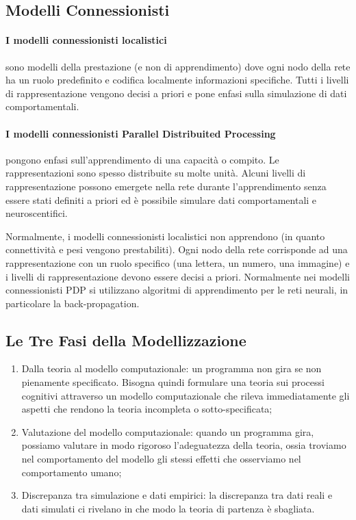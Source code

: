 \documentclass[12pt, a4paper]{article}
\begin{document}
\subsection{Modelli Connessionisti}
\paragraph{I modelli connessionisti localistici} sono modelli della prestazione (e non di apprendimento) dove ogni nodo della rete ha un ruolo predefinito e codifica localmente informazioni specifiche. Tutti i livelli di rappresentazione vengono decisi a priori e pone enfasi sulla simulazione di dati comportamentali.
\paragraph{I modelli connessionisti Parallel Distribuited Processing} pongono enfasi sull'apprendimento di una capacità o compito. Le rappresentazioni sono spesso distribuite su molte unità. Alcuni livelli di rappresentazione possono emergete nella rete durante l'apprendimento senza essere stati definiti a priori ed è possibile simulare dati comportamentali e neuroscentifici.

Normalmente, i modelli connessionisti localistici non apprendono (in quanto connettività e pesi vengono prestabiliti). Ogni nodo della rete corrisponde ad una rappresentazione con un ruolo specifico (una lettera, un numero, una immagine) e i livelli di rappresentazione devono essere decisi a priori.
Normalmente nei modelli connessionisti PDP si utilizzano algoritmi di apprendimento per le reti neurali, in particolare la back-propagation.

\subsection{Le Tre Fasi della Modellizzazione}
\begin{enumerate}
    \item Dalla teoria al modello computazionale: un programma non gira se non pienamente specificato. Bisogna quindi formulare una teoria sui processi cognitivi attraverso un modello computazionale che rileva immediatamente gli aspetti che rendono la teoria incompleta o sotto-specificata;
    \item Valutazione del modello computazionale: quando un programma gira, possiamo valutare in modo rigoroso l'adeguatezza della teoria, ossia troviamo nel comportamento del modello gli stessi effetti che osserviamo nel comportamento umano;
    \item Discrepanza tra simulazione e dati empirici: la discrepanza tra dati reali e dati simulati ci rivelano in che modo la teoria di partenza è sbagliata.
\end{enumerate}
\end{document}

